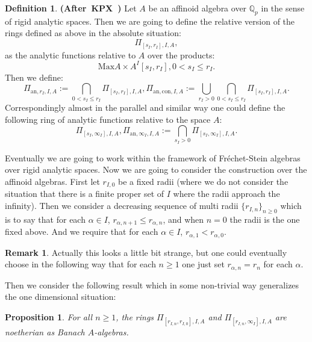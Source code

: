 \documentclass[12pt]{amsart}
\newtheorem{proposition}[theorem]{Proposition}
\theoremstyle{definition}
\newtheorem{definition}[theorem]{Definition}
\newtheorem{remark}[theorem]{Remark}
\numberwithin{equation}{section}
\begin{document}
\begin{definition} \mbox{\bf{(After KPX \cite[Notation 2.1.1]{KPX})}}
Let $A$ be an affinoid algebra over $\mathbb{Q}_p$ in the sense of rigid analytic spaces. Then we are going to define the relative version of the rings defined as above in the absolute situation:
\begin{displaymath}
\Pi_{[s_I,r_I],I,A}, 
\end{displaymath}
as the analytic functions relative to $A$ over the products:
\begin{displaymath}
\mathrm{Max}A\times A^I[s_I,r_I],0<s_I\leq r_I.
\end{displaymath}
Then we define:
\begin{displaymath}
\Pi_{\mathrm{an},r_I,I,A}:=\bigcap_{0<s_I\leq r_I} \Pi_{[s_I,r_I],I,A},\Pi_{\mathrm{an},\mathrm{con},I,A}:=\bigcup_{r_I>0}\bigcap_{0<s_I\leq r_I} \Pi_{[s_I,r_I],I,A}.	
\end{displaymath}
Correspondingly almost in the parallel and similar way one could define the following ring of analytic functions relative to the space $A$:
\begin{displaymath}
\Pi_{[s_I,\infty_I],I,A},\Pi_{\mathrm{an},\infty_I,I,A}:=\bigcap_{s_I>0}\Pi_{[s_I,\infty_I],I,A}.	
\end{displaymath}
\end{definition}


\indent Eventually we are going to work within the framework of Fr\'echet-Stein algebras over rigid analytic spaces. Now we are going to consider the construction over the affinoid algebras. First let $r_{I,0}$ be a fixed radii (where we do not consider the situation that there is a finite proper set of $I$ where the radii approach the infinity). Then we consider a decreasing sequence of multi radii $\{r_{I,n}\}_{n\geq 0}$ which is to say that for each $\alpha\in I$, $r_{\alpha,n+1}\leq r_{\alpha,n}$, and when $n=0$ the radii is the one fixed above. And we require that for each $\alpha\in I$, $r_{\alpha,1}< r_{\alpha,0}$.


\begin{remark}
Actually this looks a little bit strange, but one could eventually choose in the following way that for each $n\geq 1$ one just set $r_{\alpha,n}=r_n$ for each $\alpha$.	
\end{remark}


\indent Then we consider the following result which in some non-trivial way generalizes the one dimensional situation:


\begin{proposition}
For all $n\geq 1$, the rings $\Pi_{[r_{I,n},r_{I,0}],I,A}$ and $\Pi_{[r_{I,n},\infty_I],I,A}$ are noetherian as Banach $A$-algebras.	
\end{proposition}
\end{document}
